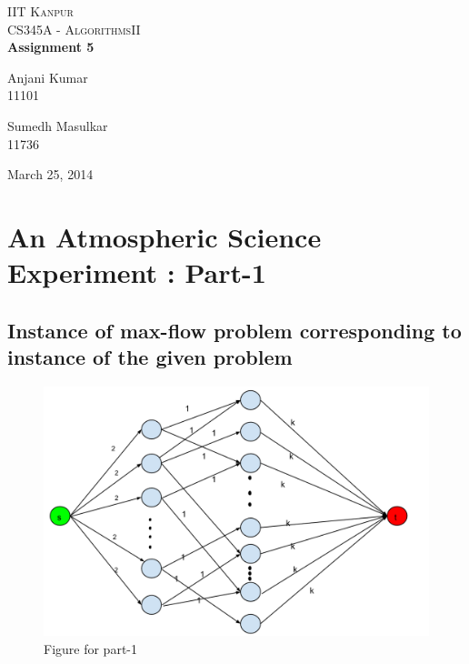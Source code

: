 \documentclass[pdftex,a4paper,12pt]{report}
\begin{document}
\begin{titlepage}
\begin{center}

\textsc{\LARGE IIT Kanpur}\\[1.5cm]

\textsc{\Large CS345A - AlgorithmsII}\\[0.5cm]

{ \huge \bfseries Assignment 5 \\[0.4cm] }


\begin{minipage}{0.4\textwidth}
\begin{flushleft} \large
Anjani Kumar\\
11101
\end{flushleft}
\end{minipage}
\begin{minipage}{0.4\textwidth}
\begin{flushright} \large
Sumedh Masulkar\\
11736
\end{flushright}
\end{minipage}

\vfill

{\large March 25, 2014}

\end{center}
\end{titlepage}

\tableofcontents
\newpage

\section{An Atmospheric Science Experiment : Part-1}

\subsection{Instance of max-flow problem corresponding to instance of the given problem}

\begin{figure}[ht!]
\centering
\includegraphics[width=150mm]{fig1.png}
\caption{Figure for part-1}
\label{fig:fig1}
\end{figure}
\end{document}
